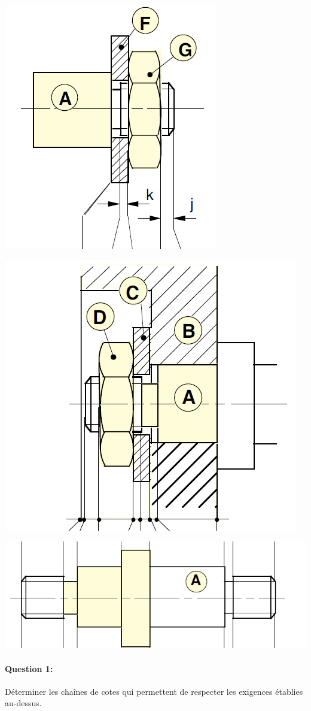 \begin{center}
 \includegraphics[width=0.4\linewidth]{img/Specif4.png}

\vspace{3cm}

 \includegraphics[width=0.5\linewidth]{img/Specif5.png}
\end{center}

\newpage

\begin{center}
 \includegraphics[width=0.7\linewidth]{img/Specif6.png}
\end{center}

\vspace{1cm}

\paragraph{Question 1:} Déterminer les chaînes de cotes qui permettent de respecter les exigences établies au-dessus.


